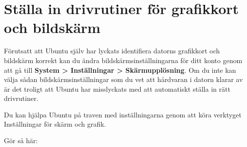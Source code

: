\documentclass[a4paper,final]{memoir} %
\begin{document}

\section{Ställa in drivrutiner för grafikkort och bildskärm}\label{sec:gtk-displayconfig}


Förutsatt att Ubuntu själv har lyckats identifiera datorns grafikkort och bildskärm korrekt kan du ändra bildskärmsinställningarna för ditt konto genom att gå till \textbf{System \textgreater{} Inställningar \textgreater{} Skärmupplösning}. Om du inte kan välja sådan bildskärmsinställningar som du vet att hårdvaran i datorn klarar av är det troligt att Ubuntu har misslyckats med att automatiskt ställa in rätt drivrutiner.

Du kan hjälpa Ubuntu på traven med inställningarna genom att köra verktyget Inställningar för skärm och grafik. 


Gör så här:
\end{document}
